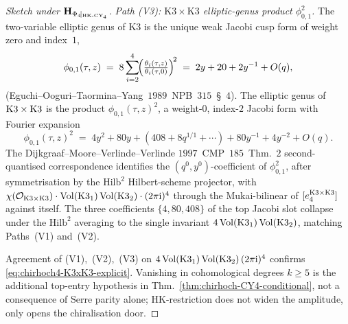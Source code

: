 \begin{proof}[Sketch under $\mathbf H_{\Phi_{4}\!\mid_{\mathrm{HK}\text{-}\mathrm{CY}_4}}$]
\emph{Path (V3): $\mathrm{K3}\times\mathrm{K3}$ elliptic-genus
product $\phi_{0,1}^2$.} The two-variable elliptic genus of
K3 is the unique weak Jacobi cusp form of weight zero and
index~$1$,
\begin{equation}
\label{eq:elliptic-genus-K3-Fourier}
 \phi_{0,1}(\tau,z)\;=\;
 8\sum_{i=2}^{4}\!\Bigl(\tfrac{\theta_i(\tau,z)}{\theta_i(\tau,0)}\Bigr)^{\!2}
 \;=\;2y+20+2y^{-1}+O(q),
\end{equation}
(Eguchi--Ooguri--Taormina--Yang~$1989$~NPB~$315$~\S~$4$). The
elliptic genus of $\mathrm{K3}\times\mathrm{K3}$ is the product
$\phi_{0,1}(\tau,z)^2$, a weight-$0$, index-$2$ Jacobi
form with Fourier expansion
\begin{equation}
\label{eq:elliptic-genus-K3xK3-Fourier}
 \phi_{0,1}(\tau,z)^2
 \;=\;
 4y^2+80y+(408+8q^{1/1}+\cdots)+80y^{-1}+4y^{-2}+O(q).
\end{equation}
The Dijkgraaf--Moore--Verlinde--Verlinde
$1997$~CMP~$185$~Thm.~$2$ second-quantised correspondence
identifies the $(q^0,y^0)$-coefficient of
$\phi_{0,1}^2$, after symmetrisation by the $\mathrm{Hilb}^2$
Hilbert-scheme projector, with $\chi(\mathcal O_{\mathrm{K3}\times\mathrm{K3}})
\cdot\mathrm{Vol}(\mathrm{K3}_1)\,\mathrm{Vol}(\mathrm{K3}_2)\cdot(2\pi\mathrm i)^4$ through the Mukai-bilinear
of $[e_4^{\mathrm{K3}\times\mathrm{K3}}]$ against itself. The three coefficients
$\{4,80,408\}$ of the top Jacobi slot collapse under the
$\mathrm{Hilb}^2$ averaging to the single invariant
$4\,\mathrm{Vol}(\mathrm{K3}_1)\,\mathrm{Vol}(\mathrm{K3}_2)$, matching Paths~(V1) and~(V2).

Agreement of (V1),~(V2),~(V3) on
$4\,\mathrm{Vol}(\mathrm{K3}_1)\,\mathrm{Vol}(\mathrm{K3}_2)\,(2\pi\mathrm i)^4$ confirms
\eqref{eq:chirhoch4-K3xK3-explicit}. Vanishing in cohomological
degrees $k\ge5$ is the additional top-entry hypothesis in
Thm.~\textup{\ref{thm:chirhoch-CY4-conditional}}, not a consequence of
Serre parity alone; HK-restriction does not widen the amplitude, only
opens the chiralisation door.
\end{proof}

